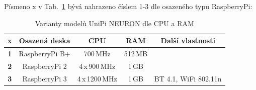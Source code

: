 \begin{table}[!ht]
\caption{Porovnání modelů UniPi NEURON dle I/O \cite{UniPiBoard2}}
\vspace{-20pt}
\label{TableUnipiIO}
	\begin{center}
	\end{center}
\end{table}

Písmeno x v Tab.~\ref{TableUnipiVar} bývá nahrazeno číslem 1-3 dle osazeného typu RaspberryPi:

\begin{table}[!ht]
\caption{Varianty modelů UniPi NEURON dle CPU a RAM \cite{UniPiBoard2}}
\vspace{-10pt}
\label{TableUnipiVar}
	\begin{center}
\begin{tabular}{|c|c|c|c|c|}
\hline
x & \textbf{Osazená deska} & \textbf{CPU} & \textbf{RAM} & \textbf{Další vlastnosti} \\ \hline \hline
\textbf{1} & RaspberryPi B+ & 700\,MHz & 512\,MB &  \\ \hline
\textbf{2} & RaspberryPi 2 & 4\,x\,900\,MHz & 1\,GB &  \\ \hline
\textbf{3} & RaspberryPi 3 & 4\,x\,1200\,MHz & 1\,GB & BT 4.1, WiFi 802.11n \\ \hline \hline
\end{tabular}
	\end{center}
\end{table}

